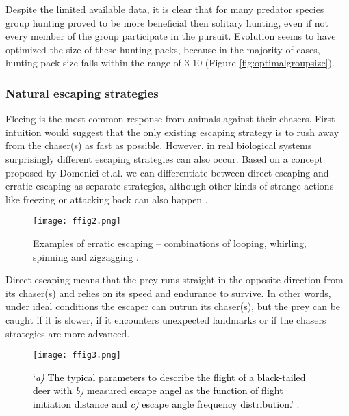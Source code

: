 \documentclass[12pt,a4paper,final]{iopart}
\newcommand{\revisiontwo}{\textcolor{black}}
\begin{document}
Despite the limited available data, it is clear that for many predator species group hunting proved to be more beneficial then solitary hunting, even if not every member of the group participate in the pursuit. Evolution seems to have optimized the size of these hunting packs, because in the majority of cases, hunting pack size falls within the range of 3-10 (Figure \ref{fig:optimalgroupsize}).   

\subsubsection{Natural escaping strategies}

Fleeing is the most common response from animals against their chasers. First intuition would suggest that the only existing escaping strategy is to rush away from the chaser(s) as fast as possible. However, in real biological systems surprisingly different escaping strategies can also occur. Based on a concept proposed by Domenici et.al. we can differentiate between direct escaping and erratic escaping as separate strategies, although other kinds of strange actions like freezing or attacking back can also happen \cite{domenici1997escape, edut2004protean, humphries1970protean}. 

\begin{figure}
\begin{center}
\texttt{[image: ffig2.png]}
\caption{Examples of erratic escaping -- combinations of  looping, whirling,  spinning and  zigzagging \cite{humphries1970protean}.}
\label{fig:zigzag}
\end{center}
\end{figure} 

Direct escaping means that the prey runs straight in the opposite direction from its chaser(s) and relies on its speed and endurance to survive. In other words, under ideal conditions the escaper can outrun its chaser(s), but the prey can be caught if it is slower, if it encounters unexpected landmarks or if the chasers strategies are more advanced. 

\begin{figure}[b]
\begin{center}
\texttt{[image: ffig3.png]}
\caption{\revisiontwo{‘{\it a)} The typical parameters to describe the flight of a black-tailed deer with {\it b)} measured escape angel as the function of  flight initiation distance and {\it c) } escape angle frequency distribution.’} \cite{domenici2011animal}.}
\label{fig:deer}
\end{center}
\end{figure} 
\end{document}
